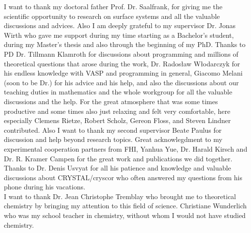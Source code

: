 \documentclass[11pt,DIV=13,BCOR=5mm,a4paper,headinclude]{scrbook}
\begin{document}
\begingroup
\renewcommand{\cleardoublepage}{}
\clearpage
{}
\endgroup
I want to thank my doctoral father Prof. Dr. Saalfrank, for giving me the scientific opportunity to research on surface systems and all the valuable discussions and advices.
Also I am deeply grateful to my supervisor Dr. Jonas Wirth who gave me support during my time starting as a Bachelor's student, during my Master's thesis and also through the beginning of my PhD.
Thanks to PD Dr. Tillmann Klamroth for discussions about programming and millions of theoretical questions that arose during the work, Dr. Rados\l{}aw W\l{}odarczyk for his endless knowledge with VASP and programming in general, Giacomo Melani (soon to be Dr.) for his advice and his help, and also the discussions about our teaching duties in mathematics and the whole workgroup for all the valuable discussions and the help.
For the great atmosphere that was some times productive and some times also just relaxing and felt very comfortable, here especially Clemens Rietze, Robert Scholz, Gereon Floss, and Steven Lindner contributed.
Also I want to thank my second supervisor Beate Paulus for discussion and help beyond research topics.
Great acknowlegdment to my experimental cooperation partners from FHI, Yanhua Yue, Dr. Harald Kirsch and Dr. R. Kramer Campen for the great work and publications we did together.
Thanks to Dr. Denis Usvyat for all his patience and knowledge and valuable discussions about CRYSTAL/cryscor who often answered my questions from his phone during his vacations.\\
I want to thank Dr. Jean Christophe Tremblay who brought me to theoretical chemistry by bringing my attention to this field of science.
Christiane Wunderlich who was my school teacher in chemistry, without whom I would not have studied chemistry.

\end{document}

